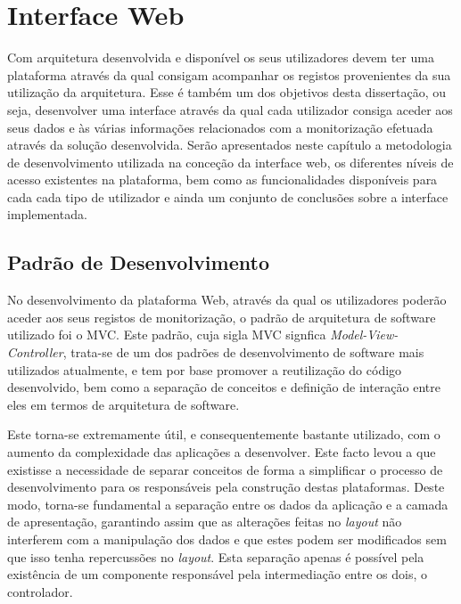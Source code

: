 \chapter{Interface Web}

Com arquitetura desenvolvida e disponível os seus utilizadores devem ter uma plataforma através da qual consigam acompanhar os registos provenientes da sua utilização da arquitetura. Esse é também um dos objetivos desta dissertação, ou seja, desenvolver uma interface através da qual cada utilizador consiga aceder aos seus dados e às várias informações relacionados com a monitorização efetuada através da solução desenvolvida. Serão apresentados neste capítulo a metodologia de desenvolvimento utilizada na conceção da interface web, os diferentes níveis de acesso existentes na plataforma, bem como as funcionalidades disponíveis para cada cada tipo de utilizador e ainda um conjunto de conclusões sobre a interface implementada.

\section{Padrão de Desenvolvimento}

No desenvolvimento da plataforma Web, através da qual os utilizadores poderão aceder aos seus registos de monitorização, o padrão de arquitetura de software utilizado foi o MVC. Este padrão, cuja sigla MVC signfica \textit{Model-View-Controller}, trata-se de um dos padrões de desenvolvimento de software mais utilizados atualmente, e tem por base promover a reutilização do código desenvolvido, bem como a separação de conceitos e definição de interação entre eles em termos de arquitetura de software\cite{bucanek2009model}. 

Este torna-se extremamente útil, e consequentemente bastante utilizado, com o aumento da complexidade das aplicações a desenvolver. Este facto levou a que existisse a necessidade de separar conceitos de forma a simplificar o processo de desenvolvimento para os responsáveis pela construção destas plataformas. Deste modo, torna-se fundamental a separação entre os dados da aplicação e a camada de apresentação, garantindo assim que as alterações feitas no \textit{layout} não interferem com a manipulação dos dados e que estes podem ser modificados sem que isso tenha repercussões no \textit{layout}. Esta separação apenas é possível pela existência de um componente responsável pela intermediação entre os dois, o controlador\cite{bucanek2009model}.

